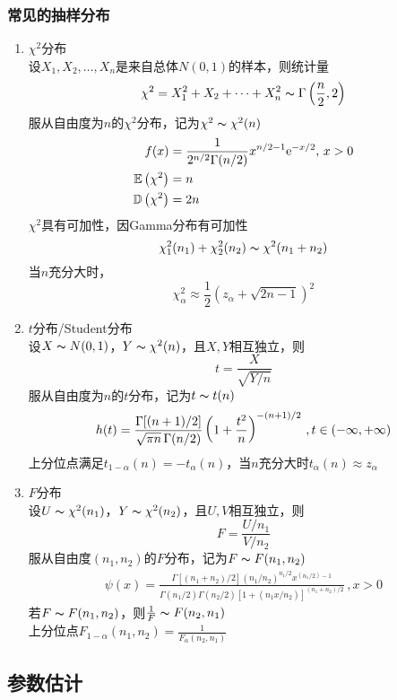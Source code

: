 \subsubsection{常见的抽样分布}
\begin{enumerate}
	\item $\chi^2$分布\\
	设$X_1,X_2,\ldots,X_n$是来自总体$N(0,1)$的样本，则统计量
	\[\chi^2=X_1^2+X_2+\cdots+X_n^2\thicksim\Gamma\left(\frac{n}{2},2\right)\]
	服从自由度为$n$的$\chi^2$分布，记为$\chi^2\thicksim\chi^2(n)$
	\[\begin{aligned}
	f(x)&=\frac{1}{2^{n/2}\Gamma(n/2)}x^{n/2-1}\mathrm{e}^{-x/2},\,x>0\\
	\mathbb{E}\left(\chi^2\right)&=n\\
	\mathbb{D}\left(\chi^2\right)&=2n
	\end{aligned}\]
	$\chi^2$具有可加性，因Gamma分布有可加性
	\[\chi_1^2(n_1)+\chi_2^2(n_2)\thicksim\chi^2(n_1+n_2)\]
	当$n$充分大时，
	\[\chi_\alpha^2\approx\frac{1}{2}(z_\alpha+\sqrt{2n-1})^2\]

	\item $t$分布/Student分布\\
	设$X\thicksim N(0,1)$，$Y\thicksim\chi^2(n)$，且$X,Y$相互独立，则
	\[t=\frac{X}{\sqrt{Y/n}}\]
	服从自由度为$n$的$t$分布，记为$t\thicksim t(n)$
	\[\begin{aligned}
	h(t)=\frac{\Gamma[(n+1)/2]}{\sqrt{\pi n}\,\Gamma(n/2)}\left(1+\frac{t^2}{n}\right)^{-(n+1)/2}\,,t\in(-\infty,+\infty)
	\end{aligned}\]
	上分位点满足$t_{1-\alpha}(n)=-t_\alpha(n)$，当$n$充分大时$t_\alpha(n)\approx z_\alpha$

	\item $F$分布\\
	设$U\thicksim\chi^2(n_1)$，$Y\thicksim\chi^2(n_2)$，且$U,V$相互独立，则
	\[F=\frac{U/n_1}{V/n_2}\]
	服从自由度$(n_1,n_2)$的$F$分布，记为$F\thicksim F(n_1,n_2)$
	\[\begin{aligned}
	\psi(x)=\frac{\Gamma[(n_1+n_2)/2](n_1/n_2)^{n_1/2}x^{(n_1/2)-1}}{\Gamma(n_1/2)\Gamma(n_2/2)[1+(n_1x/n_2)]^{(n_1+n_2)/2}}\,,x>0
	\end{aligned}\]
	若$F\thicksim F(n_1,n_2)$，则$\frac{1}{F}\thicksim F(n_2,n_1)$\\
	上分位点$F_{1-\alpha}(n_1,n_2)=\frac{1}{F_\alpha(n_2,n_1)}$
\end{enumerate}

\subsection{参数估计}
